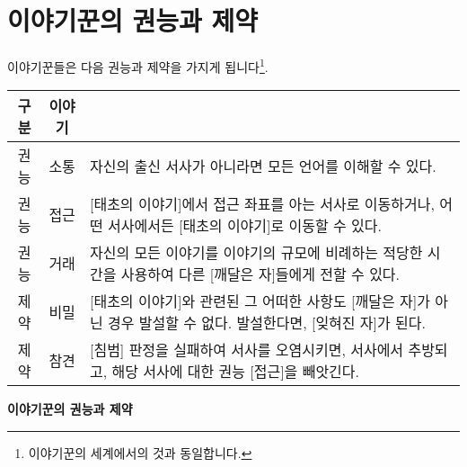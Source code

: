 \documentclass{report}
\begin{document}
	\hypertarget{ability-limit}{}
	\section*{이야기꾼의 권능과 제약}
	이야기꾼들은 다음 권능과 제약을 가지게 됩니다\footnote{이야기꾼의 세계에서의 것과 동일합니다.}.
	
	\smallskip
	
	\begin{minipage}{\textwidth}
		\begin{tabularx}{\textwidth}{c|c|X}
			\hline
			\textbf{구분} & \textbf{이야기} & \makecell{\centering\textbf{서술}} \\ \hline \hline
			권능 & 소통\index{소통} & 자신의 출신 서사가 아니라면 모든 언어를 이해할 수 있다. \\ \hline
			권능 & 접근\index{접근} & [태초의 이야기]에서 접근 좌표를 아는 서사로 이동하거나, 어떤 서사에서든 [태초의 이야기]로 이동할 수 있다. \\ \hline
			권능 & 거래\index{거래} & 자신의 모든 이야기를 이야기의 규모에 비례하는 적당한 시간을 사용하여 다른 [깨달은 자]들에게 전할 수 있다. \\ \hline
			제약 & 비밀\index{비밀} & [태초의 이야기]와 관련된 그 어떠한 사항도 [깨달은 자]가 아닌 경우 발설할 수 없다. 발설한다면, [잊혀진 자]가 된다. \\ \hline
			제약 & 참견\index{참견} & [침범] 판정을 실패하여 서사를 오염시키면, 서사에서 추방되고, 해당 서사에 대한 권능 [접근]을 빼앗긴다. \\\hline
		\end{tabularx}
		
		\smallskip
		
		\begin{tightcenter}
			\textbf{이야기꾼의 권능과 제약}
		\end{tightcenter}
	\end{minipage}
	
\end{document}

